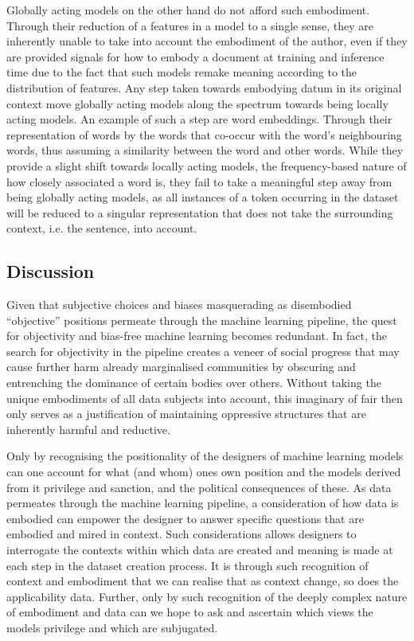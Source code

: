 Globally acting models on the other hand do not afford such embodiment. Through their reduction of a features in a model to a single sense, they are inherently unable to take into account the embodiment of the author, even if they are provided signals for how to embody a document at training and inference time due to the fact that such models remake meaning according to the distribution of features. Any step taken towards embodying datum in its original context move globally acting models along the spectrum towards being locally acting models. An example of such a step are word embeddings. Through their representation of words by the words that co-occur with the word's neighbouring words, thus assuming a similarity between the word and other words. While they provide a slight shift towards locally acting models, the frequency-based nature of how closely associated a word is, they fail to take a meaningful step away from being globally acting models, as all instances of a token occurring in the dataset will be reduced to a singular representation that does not take the surrounding context, i.e. the sentence, into account.

\subsection{Discussion}

Given that subjective choices and biases masquerading as disembodied ``objective'' positions permeate through the machine learning pipeline, the quest for objectivity and bias-free machine learning becomes redundant. In fact, the search for objectivity in the pipeline creates a veneer of social progress that may cause further harm already marginalised communities by obscuring and entrenching the dominance of certain bodies over others. Without taking the unique embodiments of all data subjects into account, this imaginary of fair then only serves as a justification of maintaining oppressive structures that are inherently harmful and reductive. 

Only by recognising the positionality of the designers of machine learning models can one account for what (and whom) ones own position and the models derived from it privilege and sanction, and the political consequences of these. As data permeates through the machine learning pipeline, a consideration of how data is embodied can empower the designer to answer specific questions that are embodied and mired in context. Such considerations allows designers to interrogate the contexts within which data are created and meaning is made at each step in the dataset creation process. It is through such recognition of context and embodiment that we can realise that as context change, so does the applicability data. Further, only by such recognition of the deeply complex nature of embodiment and data can we hope to ask and ascertain which views the models privilege and which are subjugated.

